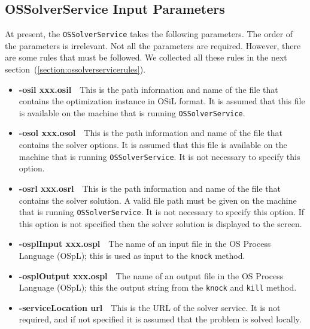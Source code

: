 \documentclass[11pt]{article}
\renewcommand{\_}{{\char"5F}}
\renewcommand{\{}{{\char"7B}}
\renewcommand{\}}{{\char"7D}}
\renewcommand{\^}{{\char"0D}}
\renewcommand{\'}{{\char"0D}}
\begin{document}
\begin{enumerate}[Step 1:]
\subsection{OSSolverService Input Parameters}

At present, the {\tt OSSolverService} takes the following parameters. The order of the parameters is irrelevant.
Not all the parameters are required. However, 
there are some rules that must be followed. We collected all these rules in the next 
section~(\ref{section:ossolverservicerules}).

\begin{itemize}

\item[] {\bf -osil xxx.osil}\ \ This is the path information and name of the file that contains the optimization 
instance in OSiL  format. It is assumed that this file is available on the machine that is running 
{\tt OSSolverService}.

\item[] {\bf -osol xxx.osol}\ \ This is the path information and name of the file that contains the solver 
options. It is assumed that this file is available on the machine that is running {\tt OSSolverService}. 
It is not necessary to specify this option.

\item[] {\bf -osrl xxx.osrl}\ \ This is the path information and name of the file that contains the solver 
solution. A valid file path must be given on the machine that is running {\tt OSSolverService}. 
It is not necessary to specify this option.
If this option is not specified then the solver solution is displayed to the screen.


\item[] {\bf -osplInput xxx.ospl}\ \  The name of an input file in the  OS Process Language (OSpL); 
this is used as input  to the {\tt knock} method.

\item[] {\bf -osplOutput xxx.ospl}\ \  The name of an output file in the  OS Process Language (OSpL); 
this the  output  string from the {\tt knock}  and {\tt kill} method.

\item[] {\bf -serviceLocation url}\ \ This is the URL of the solver service. It is not required, and if not specified it is assumed that the problem is solved locally.


\end{itemize}
\end{enumerate}
\end{document}
